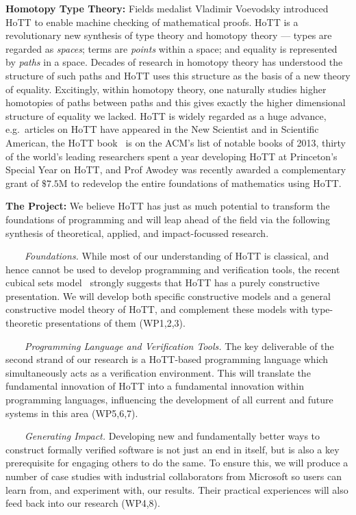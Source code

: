 \documentclass[a4paper,11pt]{article}
\newcommand{\eg}{{e.g.}\ }
\begin{document}
{\bf Homotopy Type Theory:} Fields medalist Vladimir Voevodsky
introduced HoTT to enable machine checking of mathematical proofs.
HoTT is a revolutionary new synthesis of type theory and homotopy
theory --- types are regarded as \emph{spaces}; terms are
\emph{points} within a space; and equality is represented by
\emph{paths} in a space. Decades of research in homotopy theory has
understood the structure of such paths and HoTT uses this structure as
the basis of a new theory of equality. Excitingly, within homotopy
theory, one naturally studies higher homotopies of paths between paths
and this gives exactly the higher dimensional structure of equality we
lacked.  HoTT is widely regarded as a huge advance, \eg articles on
HoTT have appeared in the New Scientist and in Scientific American,
the HoTT book~\cite{hott-book} is on the ACM's list of notable books
of 2013, thirty of the world's leading researchers spent a year
developing HoTT at Princeton's Special Year on HoTT, and Prof Awodey
was recently awarded a complementary grant of $\$ 7.5$M to redevelop
the entire foundations of mathematics using HoTT.


{\bf The Project:} We believe HoTT has just as much potential to
transform the foundations of programming and will leap
ahead of the field via the following
synthesis of theoretical, applied, and impact-focussed research.

$\;\;\; \;\;\;$ {\em Foundations.} 
While most of our understanding of HoTT is classical, and hence
cannot be used to develop programming and verification
tools, the recent cubical sets model~\cite{BezemM:cubsmt,nominal} %
strongly suggests that HoTT has a purely constructive
presentation. We will develop both specific constructive models and a
general constructive model theory of HoTT, and complement these models
with type-theoretic presentations of them (WP1,2,3).

$\;\;\;\;\;\;$ {\em Programming Language and Verification Tools.} The key
  deliverable of the second strand of our research is a HoTT-based
  programming language which simultaneously acts as a verification
  environment. This will translate the fundamental innovation of HoTT
  into a fundamental innovation within programming languages,
  influencing the development of all current and future systems in
  this area (WP5,6,7).

  $\;\;\;\;\;\;$ {\em Generating Impact.} Developing new and
  fundamentally better ways to construct formally verified software is
  not just an end in itself, but is also a key prerequisite for
  engaging others to do the same.  To ensure this, we will produce a
  number of case studies with industrial collaborators from Microsoft so users can
  learn from, and experiment with, our results. Their practical
  experiences will also feed back into our research (WP4,8).
\end{document}
